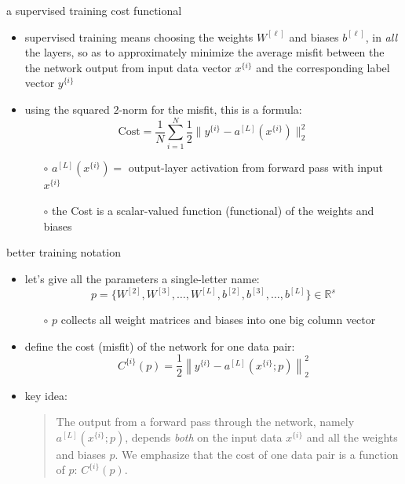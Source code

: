 \documentclass[xcolor={svgnames},
               hyperref={colorlinks,citecolor=DeepPink4,linkcolor=FireBrick,urlcolor=Maroon}]
               {beamer}
\newcommand{\RR}{\mathbb{R}}
\begin{document}
\begin{frame}{a supervised training cost functional}

\begin{itemize}
\item \alert{supervised training} means choosing the weights $W^{[\ell]}$ and biases $b^{[\ell]}$, in \emph{all} the layers, so as to approximately minimize the \alert{average misfit} between the the network output from input data vector $x^{\{i\}}$ and the corresponding label vector $y^{\{i\}}$
\item using the squared $2$-norm for the misfit, this is a formula:
    $$\text{Cost} = \frac{1}{N} \sum_{i=1}^N \frac{1}{2} \|y^{\{i\}} - a^{[L]}(x^{\{i\}})\|_2^2$$

    \begin{itemize}
    \item[$\circ$] $a^{[L]}(x^{\{i\}}) =$ output-layer activation from forward pass with input $x^{\{i\}}$
    \item[$\circ$] the Cost is a scalar-valued function (\alert{functional}) of the weights and biases
    \end{itemize}
\end{itemize}
\end{frame}


\begin{frame}{better training notation}

\begin{itemize}
\item let's give all the parameters a single-letter name:
   $$p = \{W^{[2]},W^{[3]},\dots,W^{[L]},b^{[2]},b^{[3]},\dots,b^{[L]}\} \in \RR^s$$

    \begin{itemize}
    \item[$\circ$] $p$ collects all weight matrices and biases into one big column vector
    \end{itemize}
\item define the cost (misfit) of the network for one data pair:
    $$C^{\{i\}}(p) = \frac{1}{2} \left\|y^{\{i\}} - a^{[L]}(x^{\{i\}}; p)\right\|_2^2$$
\item key idea:

\medskip
\begin{quote}
The output from a forward pass through the network, namely $a^{[L]}(x^{\{i\}}; p)$, depends \emph{both} on the input data $x^{\{i\}}$ and all the weights and biases $p$.  We emphasize that the cost of one data pair is a function of $p$: $C^{\{i\}}(p)$.
\end{quote}
\end{itemize}
\end{frame}
\end{document}
